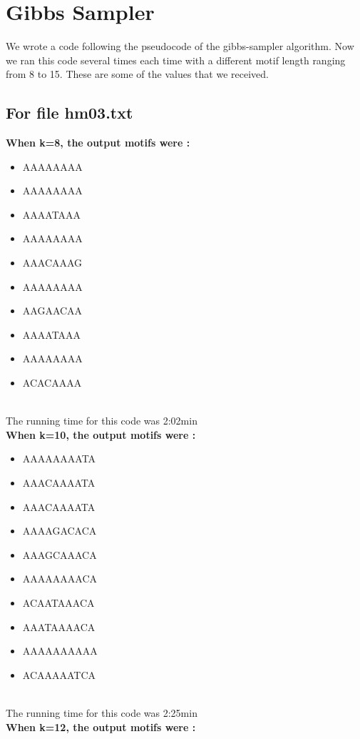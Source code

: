 \documentclass{report}
\begin{document}
\section{Gibbs Sampler}
We wrote a code following the pseudocode of the gibbs-sampler algorithm. Now we ran this code several times each time with a different motif length ranging from 8 to 15. These are some of the values that we received.
\subsection{For file hm03.txt}
\textbf{When k=8, the output motifs were :} 
\begin{itemize}
    \item AAAAAAAA
    \item AAAAAAAA
    \item AAAATAAA
    \item AAAAAAAA
    \item AAACAAAG
    \item AAAAAAAA
    \item AAGAACAA
    \item AAAATAAA
    \item AAAAAAAA
    \item ACACAAAA
\end{itemize}\\
The running time for this code was 2:02min\\
\textbf{When k=10, the output motifs were : }

\begin{itemize}
    \item AAAAAAAATA
    \item AAACAAAATA
    \item AAACAAAATA
    \item AAAAGACACA
    \item AAAGCAAACA
    \item AAAAAAAACA
    \item ACAATAAACA
    \item AAATAAAACA
    \item AAAAAAAAAA
    \item ACAAAAATCA
    
\end{itemize}\\
The running time for this code was 2:25min\\
\textbf{When k=12, the output motifs were : }
\end{document}
